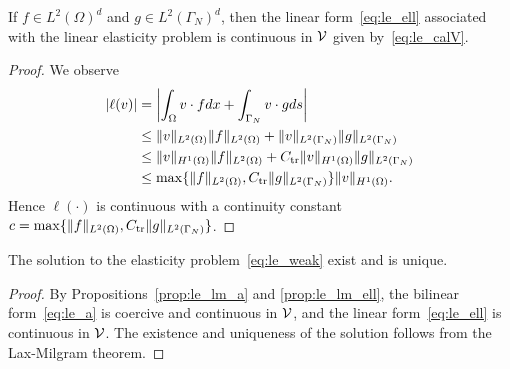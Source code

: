 \begin{proposition}
  \label{prop:le_lm_ell}
  If $f \in L^2(\Omega)^d$ and $g \in L^2(\Gamma_N)^d$, then the linear form~\eqref{eq:le_ell} associated with the linear elasticity problem is continuous in $\mathcal{V}$ given by~\eqref{eq:le_calV}.
  \begin{proof}
    We observe
    \begin{align*}
    | \ell(v) | &= \left| \int_{\Omega} v \cdot f dx + \int_{\Gamma_N} v \cdot g ds \right|\\
    &\leq \| v \|_{L^2(\Omega)} \| f \|_{L^2(\Omega)} + \| v \|_{L^2(\Gamma_N)} \| g \|_{L^2(\Gamma_N)}\\
    &\leq \| v \|_{H^1(\Omega)} \| f \|_{L^2(\Omega)} + C_{\rm tr} \| v \|_{H^1(\Omega)} \| g \|_{L^2(\Gamma_N)}\\
    &\leq \max\{ \| f \|_{L^2(\Omega)}, C_{\rm tr} \| g \|_{L^2(\Gamma_N)} \} \| v \|_{H^1(\Omega)}.
    \end{align*}
    Hence $\ell(\cdot)$ is continuous with a continuity constant $c = \max\{ \| f \|_{L^2(\Omega)}, C_{\rm tr} \| g \|_{L^2(\Gamma_N)} \}$.
  \end{proof}
\end{proposition}
\begin{proposition}
  The solution to the elasticity problem~\eqref{eq:le_weak} exist and is unique.
  \begin{proof}
    By Propositions~\ref{prop:le_lm_a} and \ref{prop:le_lm_ell}, the bilinear form~\eqref{eq:le_a} is coercive and continuous in $\mathcal{V}$, and the linear form~\eqref{eq:le_ell} is continuous in $\mathcal{V}$.  The existence and  uniqueness of the solution follows from the Lax-Milgram theorem.
  \end{proof}
\end{proposition}

